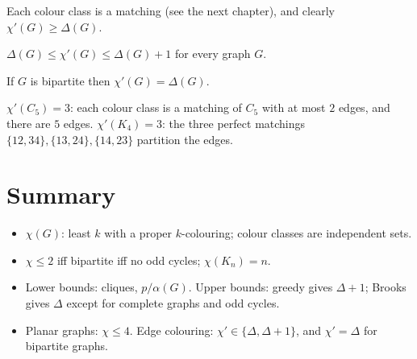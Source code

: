 Each colour class is a matching (see the next chapter), and clearly $\chi'(G) \ge \Delta(G)$.

\begin{theorem}
$\Delta(G) \le \chi'(G) \le \Delta(G) + 1$ for every graph $G$.
\end{theorem}

\begin{theorem}
If $G$ is bipartite then $\chi'(G) = \Delta(G)$.
\end{theorem}

\begin{example}
$\chi'(C_5) = 3$: each colour class is a matching of $C_5$ with at most $2$ edges, and there are
$5$ edges. $\chi'(K_4) = 3$: the three perfect matchings $\{12,34\},\{13,24\},\{14,23\}$
partition the edges.
\end{example}

\begin{center}
\end{center}

\section{Summary}
\begin{itemize}
  \item $\chi(G)$: least $k$ with a proper $k$-colouring; colour classes are independent sets.
  \item $\chi\le2$ iff bipartite iff no odd cycles; $\chi(K_n) = n$.
  \item Lower bounds: cliques, $p/\alpha(G)$. Upper bounds: greedy gives $\Delta+1$; Brooks gives
        $\Delta$ except for complete graphs and odd cycles.
  \item Planar graphs: $\chi \le 4$. Edge colouring: $\chi' \in\{\Delta, \Delta+1\}$, and $\chi'=\Delta$
        for bipartite graphs.
\end{itemize}
